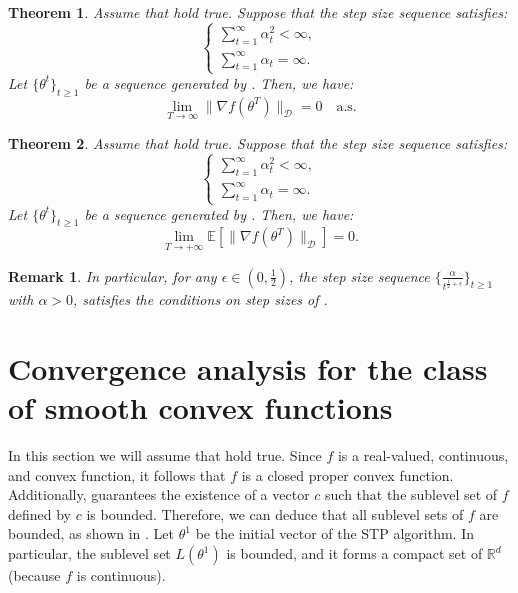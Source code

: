 \documentclass{article} %
\newtheorem{theorem}{Theorem}
\newtheorem{Remark}{Remark}
\begin{document}
 

\begin{theorem}\label{Thm2}
Assume that  hold true. Suppose that the step size sequence satisfies:
\[
\begin{cases}
    \sum_{t=1}^{\infty} \alpha_t^2 < \infty, \\
    \sum_{t=1}^{\infty} \alpha_t = \infty.
\end{cases}
\]
Let \( \{\theta^t\}_{t \ge 1} \) be a sequence generated by . Then, we have:
\[
\lim_{T \to \infty} \lVert \nabla f(\theta^T) \rVert_{\mathcal{D}} = 0 \quad \text{a.s.}
\]

\end{theorem}


\begin{theorem}\label{Thm3}
Assume that  hold true. Suppose that the step size sequence satisfies:
\[
\begin{cases}
    \sum_{t=1}^{\infty} \alpha_t^2 < \infty, \\
    \sum_{t=1}^{\infty} \alpha_t = \infty.
\end{cases}
\]
Let \( \{\theta^t\}_{t \ge 1} \) be a sequence generated by . Then, we have:
\[
\lim\limits_{T \rightarrow +\infty} \mathbb{E}[ \lVert \nabla f(\theta^T) \rVert_{\mathcal{D}}]=0 .
\]    
\end{theorem}


\begin{Remark}\label{Rem5}
   In particular, for any $\epsilon \in (0,\frac{1}{2})$, the step size sequence $\{\frac{\alpha}{t^{\frac{1}{2}+\epsilon}} \}_{t \ge 1}$ with $\alpha>0$, satisfies the conditions on step sizes of .
   \end{Remark}
\section{Convergence analysis for the class of smooth convex functions}
In this section we will assume that   hold true. 
Since \( f \) is a real-valued, continuous, and convex function, it follows that \( f \) is a closed proper convex function. Additionally,  guarantees the existence of a vector \( c \) such that the sublevel set of $f$ defined by \( c \) is bounded. Therefore, we can deduce that all sublevel sets of \( f \) are bounded, as shown in \citep[Corollary 8.7.1]{rockafellar2015convex}. 
Let \( \theta^1 \) be the initial vector of the STP algorithm. In particular, the sublevel set $L(\theta^1)$ is bounded, and it forms a compact set of \( \mathbb{R}^d \) (because $f$ is continuous).
\end{document}
